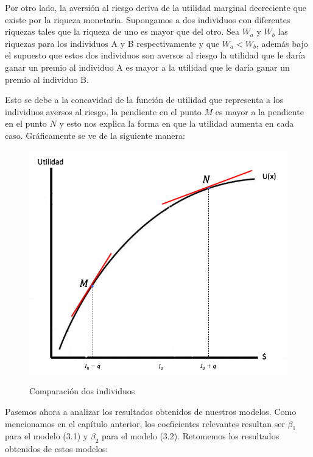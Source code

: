 Por otro lado, la aversión al riesgo deriva de la utilidad marginal decreciente que existe por la riqueza monetaria. Supongamos a dos individuos con diferentes riquezas tales que la riqueza de uno es mayor que del otro. Sea $W_a$ y $W_b$ las riquezas para los individuos A y B respectivamente y que $W_a < W_b$, además bajo el supuesto que estos dos individuos son aversos al riesgo la utilidad que le daría ganar un premio al individuo A es mayor a la utilidad que le daría ganar un premio al individuo B. \\

\newpage

Esto se debe a la concavidad de la función de utilidad que representa a los individuos aversos al riesgo, la pendiente en el punto $M$ es mayor a la pendiente en el punto $N$ y esto nos explica la forma en que la utilidad aumenta en cada caso. Gráficamente se ve de la siguiente manera:

\begin{figure}[H]
    \centering
    \caption{Comparación dos individuos}
    \label{fig:my_label}
    \includegraphics[width=.85\linewidth]{Imagenes/UE_MN.png} \\
\end{figure}




\newpage

Pasemos ahora a analizar los resultados obtenidos de nuestros modelos. Como mencionamos en el capítulo anterior, los coeficientes relevantes resultan ser $\beta_1$ para el modelo (3.1) y $\beta_2$ para el modelo (3.2). Retomemos los resultados obtenidos de estos modelos:

